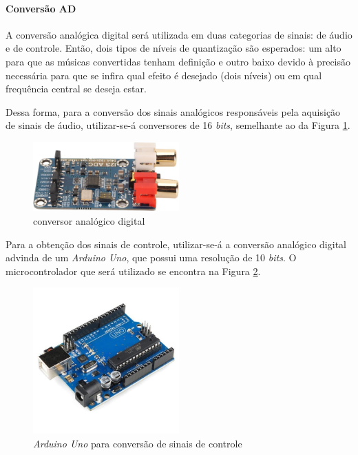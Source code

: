 \paragraph{Conversão AD}

A conversão analógica digital será utilizada em duas categorias de sinais: de áudio e de controle. Então, dois tipos de níveis de quantização são esperados: um alto para que as músicas convertidas tenham definição e outro baixo devido à precisão necessária para que se infira qual efeito é desejado (dois níveis) ou em qual frequência central se deseja estar.

Dessa forma, para a conversão dos sinais analógicos responsáveis pela aquisição de sinais de áudio, utilizar-se-á conversores de 16 \textit{bits}, semelhante ao da Figura \ref{fig63}.

\begin{figure}[h]
    \centering
    \includegraphics[width=0.5\textwidth]{figuras/fig63.jpg}
    \caption{conversor analógico digital \cite{walmartRobotHuman}}
    \label{fig63}
\end{figure}    

Para a obtenção dos sinais de controle, utilizar-se-á a conversão analógico digital advinda de um \textit{Arduino Uno}, que possui uma resolução de 10 \textit{bits}. O microcontrolador que será utilizado se encontra na Figura \ref{fig64}.

\begin{figure}[h]
    \centering
    \includegraphics[width=0.5\textwidth]{figuras/fig64.jpeg}
    \caption{\textit{Arduino Uno} para conversão de sinais de controle \cite{vidadesilicioPlacaCabo}}
    \label{fig64}
\end{figure}    

